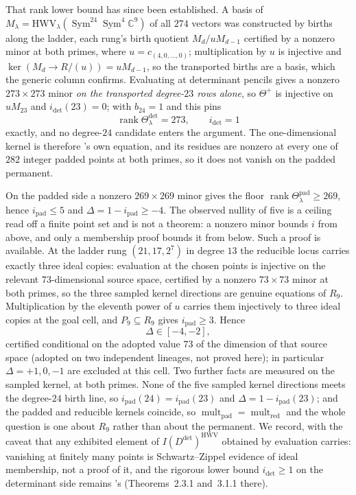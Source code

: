\documentclass[11pt]{amsart}
\theoremstyle{plain}
\theoremstyle{definition}
\theoremstyle{remark}
\DeclareMathOperator{\Sym}{Sym}
\DeclareMathOperator{\mult}{mult}
\DeclareMathOperator{\rank}{rank}
\newcommand{\bC}{\mathbb{C}}
\newcommand{\Rr}{R}
\newcommand{\Pp}{P}
\newcommand{\Ddet}{D^{\det}}
\begin{document}
That rank lower bound has since been established.  A basis of
$M_{\lambda}=\mathrm{HWV}_{\lambda}(\Sym^{24}\Sym^{4}\bC^{9})$ of all $274$
vectors was constructed by births along the ladder, each rung's birth quotient
$M_d/uM_{d-1}$ certified by a nonzero minor at both primes, where
$u=c_{(4,0,\dots,0)}$; multiplication by $u$ is injective and
$\ker(M_d\to R/(u))=uM_{d-1}$, so the transported births are a basis, which the
generic column confirms.  Evaluating at determinant pencils gives a nonzero
$273\times273$ minor \emph{on the transported degree-$23$ rows alone}, so
$\Theta^{+}$ is injective on $uM_{23}$ and $i_{\det}(23)=0$; with
$b_{24}=1$ and \cite{LMR} this pins
\[
  \rank\Theta_{\lambda}^{\det}=273,\qquad i_{\det}=1
\]
exactly, and no degree-$24$ candidate enters the argument.  The one-dimensional
kernel is therefore \cite{LMR}'s own equation, and its residues are nonzero at
every one of $282$ integer padded points at both primes, so it does not vanish on
the padded permanent.

On the padded side a nonzero $269\times269$ minor gives the floor
$\rank\Theta_{\lambda}^{\mathrm{pad}}\ge269$, hence $i_{\mathrm{pad}}\le5$ and
$\Delta=1-i_{\mathrm{pad}}\ge-4$.  The observed nullity of five is a ceiling read
off a finite point set and is not a theorem: a nonzero minor bounds $i$ from
above, and only a membership proof bounds it from below.  Such a proof is
available.  At the ladder rung $(21,17,2^{7})$ in degree $13$ the reducible
locus carries exactly three ideal copies: evaluation at the chosen points is
injective on the relevant $73$-dimensional source space, certified by a
nonzero $73\times73$ minor at both primes, so the three sampled kernel
directions are genuine equations of $\Rr_9$.  Multiplication by the
eleventh power of $u$ carries them injectively to three ideal copies at the
goal cell, and $\Pp_9\subseteq\Rr_9$ gives $i_{\mathrm{pad}}\ge3$.  Hence
\[
  \Delta\in[-4,-2],
\]
certified conditional on the adopted value $73$ of the dimension of that source
space (adopted on two independent lineages, not proved here); in particular
$\Delta=+1,0,-1$ are excluded at this cell.  Two further facts are measured on
the sampled kernel, at both primes.  None of the five sampled
kernel directions meets the degree-$24$ birth line, so
$i_{\mathrm{pad}}(24)=i_{\mathrm{pad}}(23)$ and $\Delta=1-i_{\mathrm{pad}}(23)$;
and the padded and reducible kernels coincide, so
$\mult_{\mathrm{pad}}=\mult_{\mathrm{red}}$ and the whole question is one about
$\Rr_9$ rather than about the permanent.  We record, with the caveat that any
exhibited element of $I(\Ddet)^{\mathrm{HWV}}$ obtained by evaluation carries:
vanishing at finitely many points is Schwartz--Zippel evidence of ideal
membership, not a proof of it, and the rigorous lower bound $i_{\det}\ge1$ on
the determinant side remains \cite{LMR}'s (Theorems~2.3.1 and~3.1.1 there).
\end{document}
